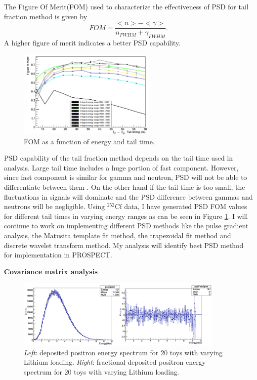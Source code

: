 \documentclass[11pt]{article}
\numberwithin{equation}{section}
\begin{document}
The Figure Of Merit(FOM) used to characterize the effectiveness of  PSD for tail fraction method is given by
\begin{equation}
FOM = \frac{<n> - <\gamma>}{n_{FWHM} + \gamma_{FWHM}}.
\end{equation}
A higher figure of merit indicates a better PSD capability.

\begin{figure}[h]
\centering
\includegraphics*[width=0.6\textwidth]{./FOM.PNG}
\caption{FOM as a function of energy and tail time.}
\label{fig:FOM}
\end{figure}

PSD capability of the tail fraction method depends on the tail time used in analysis. Large tail time includes a huge portion of fast component. However, since fast component is similar for gamma and neutron, PSD will not be able to differentiate between them . On the other hand if the tail time is too small, the fluctuations in signals will dominate and the PSD difference between gammas and neutrons will be negligible. Using $^{252}  \text{Cf}$ data, I have generated PSD FOM values for different tail times in varying energy ranges as can be seen in Figure \ref{fig:FOM}. I will continue to work on implementing different PSD methods like the pulse gradient analysis, the Matusita template fit method, the trapezoidal fit method and discrete wavelet transform method.  My analysis will identify best PSD method for implementation in PROSPECT. 

\noindent
\textbf{Covariance matrix analysis}

\begin{figure}[h]
\centering
\includegraphics*[width=0.9\textwidth]{./frac.PNG}
\caption[Li-loading based deposited and fractional deposited spectrum]{\textit{Left}: deposited positron energy spectrum for 20 toys with varying Lithium loading. \textit{Right}: fractional deposited positron energy spectrum for 20 toys with varying Lithium loading. }
\label{fig:frac}
\end{figure}
\end{document}
